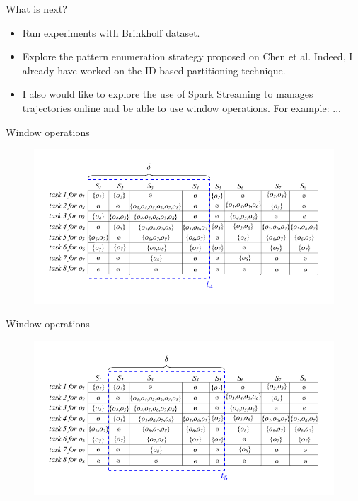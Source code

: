 \documentclass{beamer}
\begin{document}
\begin{frame}{What is next?}
    \begin{itemize}
        \item Run experiments with Brinkhoff dataset.
        \item Explore the pattern enumeration strategy proposed on Chen et al. Indeed, I already have worked on the ID-based partitioning technique.
        \item I also would like to explore the use of Spark Streaming to manages trajectories online and be able to use window operations. For example: ...
    \end{itemize}
\end{frame}

\begin{frame}{Window operations}
    \centering
    \begin{figure}
        \includegraphics[width=.9\textwidth]{figures/Window01}
    \end{figure}    
\end{frame}
\begin{frame}{Window operations}
    \centering
    \begin{figure}
        \includegraphics[width=.9\textwidth]{figures/Window02}
    \end{figure}    
\end{frame}
\end{document}
